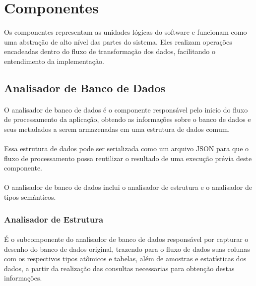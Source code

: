 \section{Componentes}

\paragraph{} Os componentes representam as unidades lógicas do software e funcionam como uma abstração de alto nível das partes do sistema. Eles realizam operações encadeadas dentro do fluxo de transformação dos dados, facilitando o entendimento da implementação.

\subsection{Analisador de Banco de Dados}

\paragraph{} O analisador de banco de dados é o componente responsável pelo inicio do fluxo de processamento da aplicação, obtendo as informações sobre o banco de dados e seus metadados a serem armazenadas em uma estrutura de dados comum.

\paragraph{} Essa estrutura de dados pode ser serializada como um arquivo JSON para que o fluxo de processamento possa reutilizar o resultado de uma execução prévia deste componente.

\paragraph{} O analisador de banco de dados inclui o analisador de estrutura e o analisador de tipos semânticos.

\subsubsection{Analisador de Estrutura}

\paragraph{} É o subcomponente do analisador de banco de dados responsável por capturar o desenho do banco de dados original, trazendo para o fluxo de dados suas colunas com os respectivos tipos atômicos e tabelas, além de amostras e estatísticas dos dados, a partir da realização das consultas necessarias para obtenção destas informações.

